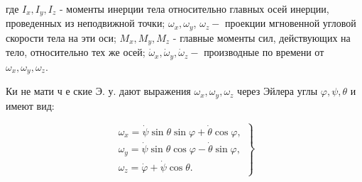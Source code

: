 \documentclass[10pt]{article}
\begin{document}
где $I_{x}, I_{y}, I_{z}$ - моменты инерции тела относительно главных осей инерции, проведенных из неподвижной точки; $\omega_{x}, \omega_{y}$, $\omega_{z}-$ проекции мгновенной угловой скорости тела на эти оси; $M_{x}, M_{y}, M_{z}$ - главные моменты сил, действующих на тело, относительно тех же осей; $\dot{\omega}_{x}, \dot{\omega}_{y}, \dot{\omega}_{z}-$ производные по времени от $\omega_{x}, \omega_{y}, \omega_{z}$.



Ки не мати ч е ские Э. у. дают выражения $\omega_{x}, \omega_{y}, \omega_{z}$ через Эйлера углы $\varphi, \psi, \theta$ и имеют вид:



\[

\left.\begin{array}{c}

\omega_{x}=\dot{\psi} \sin \theta \sin \varphi+\dot{\theta} \cos \varphi, \\

\omega_{y}=\dot{\psi} \sin \theta \cos \varphi-\dot{\theta} \sin \varphi, \\

\omega_{z}=\dot{\varphi}+\dot{\psi} \cos \theta .

\end{array}\right\}

\]
\end{document}
